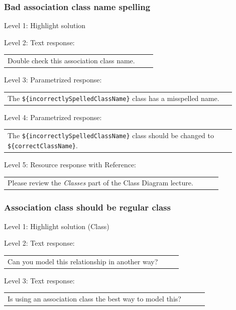 \subsubsection{Bad association class name spelling}

\noindent Level 1: Highlight solution  \medskip

\noindent Level 2: Text response: \medskip

\begin{tabular}{|p{0.9\linewidth}}
Double check this association class name.
\end{tabular} \medskip

\noindent Level 3: Parametrized response: \medskip

\begin{tabular}{|p{0.9\linewidth}}
The \verb|${incorrectlySpelledClassName}| class has a misspelled name.
\end{tabular} \medskip

\noindent Level 4: Parametrized response: \medskip

\begin{tabular}{|p{0.9\linewidth}}
The \verb|${incorrectlySpelledClassName}| class should be changed to \verb|${correctClassName}|.
\end{tabular} \medskip

\noindent Level 5: Resource response with Reference: \medskip

\begin{tabular}{|p{0.9\linewidth}}
Please review the \textit{Classes} part of the Class Diagram lecture.
\end{tabular} \medskip


\subsubsection{Association class should be regular class}

\noindent Level 1: Highlight solution (Class) \medskip

\noindent Level 2: Text response: \medskip

\begin{tabular}{|p{0.9\linewidth}}
Can you model this relationship in another way?
\end{tabular} \medskip

\noindent Level 3: Text response: \medskip

\begin{tabular}{|p{0.9\linewidth}}
Is using an association class the best way to model this?
\end{tabular} \medskip

